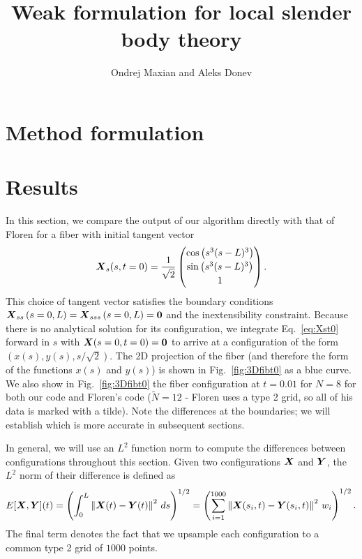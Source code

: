 \documentclass{article}
\title{Weak formulation for local slender body theory}
\author{Ondrej Maxian and Aleks Donev}
\newcommand{\norm}[1]{\left\lVert #1 \right\rVert}
\newcommand{\bm}[1]{\mbox{\boldmath $ #1 $}}    %
\begin{document}
\maketitle
\section{Method formulation}


\newpage
\section{Results}
In this section, we compare the output of our algorithm directly with that of Floren for a fiber with initial tangent vector
\begin{equation}
\label{eq:Xst0}
\bm{X}_s(s,t=0) = \frac{1}{\sqrt{2}}\begin{pmatrix} \cos{\left(s^3 (s-L)^3\right)}\\[2 pt] \sin{\left(s^3(s-L)^3\right)}\\[2 pt] 1 \end{pmatrix}. 
\end{equation}
This choice of tangent vector satisfies the boundary conditions $\displaystyle \bm{X}_{ss}\left(s=0,L\right)=\bm{X}_{sss}\left(s=0,L\right)=\bm{0}$ and the inextensibility constraint. Because there is no analytical solution for its configuration, we integrate Eq.\ \eqref{eq:Xst0} forward in $s$ with $\bm{X}(s=0,t=0)=\bm{0}$ to arrive at a configuration of the form $(x(s),y(s),s/\sqrt{2})$. The 2D projection of the fiber (and therefore the form of the functions $x(s)$ and $y(s)$) is shown in Fig.\ \ref{fig:3Dfibt0} as a blue curve. We also show in Fig.\ \ref{fig:3Dfibt0} the fiber configuration at $t=0.01$ for $N=8$ for both our code and Floren's code ($\tilde{N}=12$ - Floren uses a type 2 grid, so all of his data is marked with a tilde). Note the differences at the boundaries; we will establish which is more accurate in subsequent sections. 

In general, we will use an $L^2$ function norm to compute the differences between configurations throughout this section. Given two configurations $\bm{X}$ and $\bm{Y}$, the $L^2$ norm of their difference is defined as
\begin{equation}
\label{eq:Errort}
E[\bm{X},\bm{Y}](t) = \left(\int_0^L \norm{\bm{X}(t)-\bm{Y}(t)}^2 \, ds\right)^{1/2} = \left( \sum_{i=1}^{1000} \norm{\bm{X}(s_i,t)-\bm{Y}(s_i,t)}^2 \, w_i  \right)^{1/2}. 
\end{equation}
The final term denotes the fact that we upsample each configuration to a common type 2 grid of $1000$ points. 
\end{document}
